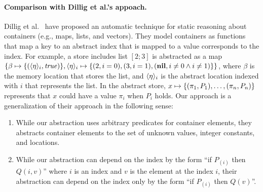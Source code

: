 
\paragraph{Comparison with Dillig et al.'s appoach.}
Dillig et al.~\cite{Dillig2011} have proposed an automatic technique for
static reasoning about containers (e.g., maps, lists, and vectors). They
model containers as functions that map a key to an abstract index that
is mapped to a value corresponds to the index.  For example, a
store includes list $[2;3]$ is abstracted as a map $\{{\beta \mapsto
\{{(\langle{\eta}\rangle_{i}, \mathit{true})}\}, \langle{\eta}\rangle_{i} \mapsto
\{{(2,i=0),(3,i=1),(\mathbf{nil},i \neq 0 \land i \neq 1)}\}}\}$, where $\beta$ is the memory location that
stores the list, and $\langle{\eta}\rangle_{i}$ is the abstract location
indexed with $i$ that represents the list.  In the abstract store, $x
\mapsto \{{(\pi_1, P_1), \dots, (\pi_n, P_n)}\}$ represents that $x$ could
have a value $\pi_i$ when $P_i$ holds.
Our approach is a generalization of their
approach in the following sense:
\begin{enumerate}
 \item While our abstraction uses arbitrary predicates for container elements,
       they abstracts container elements to the set of unknown values,
       integer constants, and locations.
 \item While our abstraction can depend on the index by the form ``if $P_(i)$
       then $Q(i,v)$'' where $i$ is an index and $v$ is the element at the
       index $i$, their abstraction can depend on the index only by the form ``if $P_(i)$
       then $Q(v)$''.
\end{enumerate}

